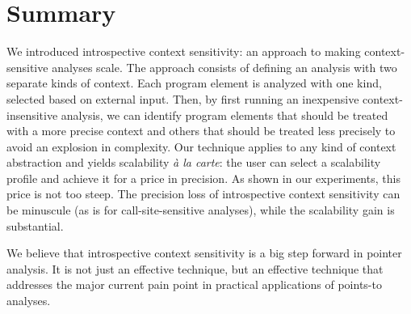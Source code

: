 \section{Summary}

We introduced introspective context sensitivity: an approach to making context-sensitive analyses scale. The approach consists of defining an analysis with two separate kinds of context. Each program element is analyzed with one kind, selected based on external input. Then, by first running an inexpensive context-insensitive analysis, we can identify program elements that should be treated with a more precise context and others that should be treated less precisely to avoid an explosion in complexity. Our technique applies to any kind of context abstraction and yields scalability \emph{\`{a} la carte}: the user can select a scalability profile and achieve it for a price in precision. As shown in our experiments, this price is not too steep. The precision loss of introspective context sensitivity can be minuscule (as is for call-site-sensitive analyses), while the scalability gain is substantial.

We believe that introspective context sensitivity is a big step forward in pointer analysis. It is not just an effective technique, but an effective technique that addresses the major current pain point in practical applications of points-to analyses.